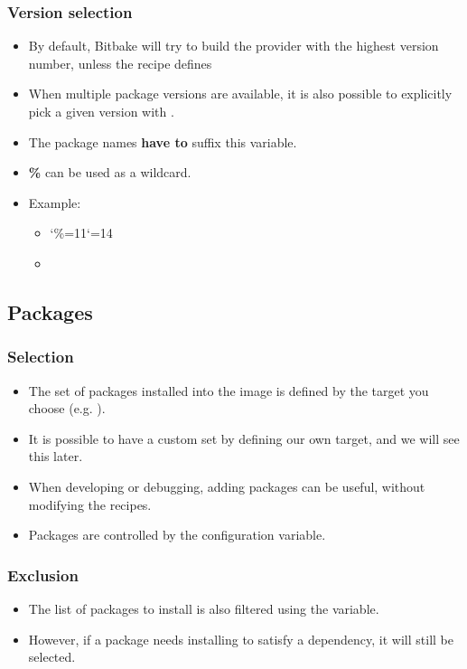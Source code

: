 \begin{frame}
  \frametitle{Version selection}
  \begin{itemize}
    \item By default, Bitbake will try to build the provider with the
      highest version number, unless the recipe defines
    \item When multiple package versions are available, it is also
      possible to explicitly pick a given version with
      .
    \item The package names {\bf have to} suffix this variable.
    \item {\bf \%} can be used as a wildcard.
    \item Example:
    \begin{itemize}
      \item \catcode`\%=11\catcode`\@=14
      \item {}
    \end{itemize}
  \end{itemize}
\end{frame}

\subsection{Packages}

\begin{frame}
  \frametitle{Selection}
  \begin{itemize}
    \item The set of packages installed into the image is defined by
      the target you choose (e.g. ).
    \item It is possible to have a custom set by defining our own
      target, and we will see this later.
    \item When developing or debugging, adding packages can be useful,
      without modifying the recipes.
    \item Packages are controlled by the 
      configuration variable.
  \end{itemize}
\end{frame}

\begin{frame}
  \frametitle{Exclusion}
  \begin{itemize}
    \item The list of packages to install is also filtered using the
       variable.
    \item However, if a package needs installing to satisfy a
      dependency, it will still be selected.
  \end{itemize}
\end{frame}

